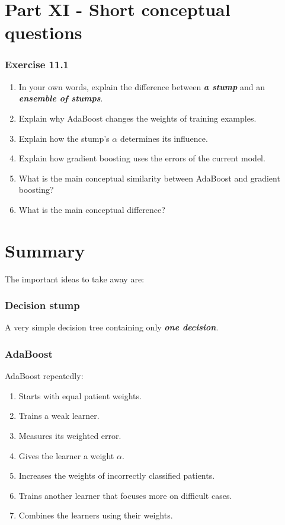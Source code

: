\documentclass{course_sheet}
\begin{document}
\section*{Part XI - Short conceptual questions}
\subsubsection*{Exercise 11.1}
\begin{enumerate}
\item
In your own words, explain the difference between \textbf{\textit{a stump}} and an \textbf{\textit{ensemble of stumps}}.

\item
Explain why AdaBoost changes the weights of training examples.

\item
Explain how the stump's $\alpha$ determines its influence.

\item
Explain how gradient boosting uses the errors of the current model.

\item
What is the main conceptual similarity between AdaBoost and gradient boosting?

\item
What is the main conceptual difference?

\end{enumerate}
\section*{Summary}
The important ideas to take away are:

\subsubsection*{Decision stump}
A very simple decision tree containing only \textbf{\textit{one decision}}.

\subsubsection*{AdaBoost}
AdaBoost repeatedly:

\begin{enumerate}
\item
Starts with equal patient weights.

\item
Trains a weak learner.

\item
Measures its weighted error.

\item
Gives the learner a weight $\alpha$.

\item
Increases the weights of incorrectly classified patients.

\item
Trains another learner that focuses more on difficult cases.

\item
Combines the learners using their weights.

\end{enumerate}
\end{document}
